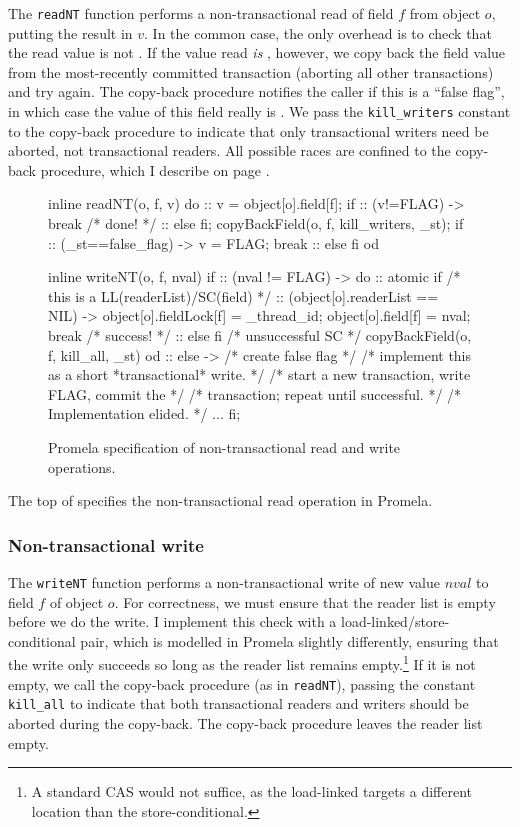 The {\tt readNT} function performs a non-transactional read of field $f$ from
object $o$, putting the result in $v$.  
In the common case, the only overhead is to check that
the read value is not \FLAG.  If the value read \emph{is}
\FLAG, however, we copy back the field value 
from the most-recently committed transaction (aborting all other
transactions) and try again.  The copy-back procedure notifies
the caller if this is a ``false flag'', in which case the value of this
field really is \FLAG.  We pass the {\tt kill\_writers} constant
to the copy-back procedure to
indicate that only transactional writers need be aborted, not
transactional readers.
All possible races are confined to the copy-back procedure, which I
describe on page \pageref{sec:copyback}.

\begin{figure}
\begin{inlinecode}
inline readNT(o, f, v) {
  do
  :: v = object[o].field[f];
     if
     :: (v!=FLAG) -> break /* done! */
     :: else
     fi;
     copyBackField(o, f, kill_writers, _st);
     if
     :: (_st==false_flag) ->
        v = FLAG;
        break
     :: else
     fi
  od
}

inline writeNT(o, f, nval) {
  if
  :: (nval != FLAG) ->
     do
     :: atomic {
          if /* this is a LL(readerList)/SC(field) */
          :: (object[o].readerList == NIL) ->
             object[o].fieldLock[f] = _thread_id;
             object[o].field[f] = nval;
             break /* success! */
          :: else
          fi
        }
        /* unsuccessful SC */
        copyBackField(o, f, kill_all, _st)
     od
  :: else -> /* create false flag */
     /* implement this as a short *transactional* write. */
     /* start a new transaction, write FLAG, commit the */
     /* transaction; repeat until successful. */
     /* Implementation elided. */
     ...
  fi;
}
\end{inlinecode}
\caption{Promela specification of non-transactional read and write operations.}
\label{fig:promrwnt}
\end{figure}
The top of  specifies the non-transactional read operation in
Promela.

\subsubsection{Non-transactional write}
The {\tt writeNT} function performs a non-transactional write of new value $nval$
to field $f$ of object $o$.  For correctness, we must ensure that
the reader list is empty before we do the write.  I implement this check
with a load-linked/store-conditional pair, which is modelled in
Promela slightly differently, ensuring that the write only succeeds
so long as the reader list remains empty.\footnote{A
  standard CAS would not suffice, as the load-linked targets a
  different location than the store-conditional.}
If it is not empty, we
call the copy-back procedure (as in {\tt readNT}), passing the
constant {\tt kill\_all} to indicate that both transactional readers
and writers should be aborted during the copy-back.  The copy-back
procedure leaves the reader list empty.

